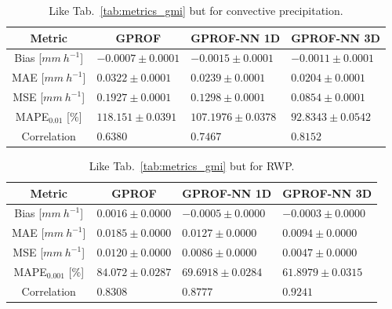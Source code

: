 \documentclass[journal abbreviation, manuscript]{copernicus}
\begin{document}
\begin{table}[hbpt!]
  \centering
  \caption{Like Tab.~\ref{tab:metrics_gmi} but for convective precipitation.}
  \label{tab:metrics_gmi_convective}
\begin{tabular}{|c||p{3.5cm}|p{3.5cm}|p{3.5cm}|}
  \hline
  Metric &
  \multicolumn{1}{|c}{GPROF} &
  \multicolumn{1}{|c}{GPROF-NN 1D} &
  \multicolumn{1}{|c|}{GPROF-NN 3D} \\
  \hline\hline
  Bias \hfill [$\unit{mm\ h^{-1}}$]   & \hfill $ -0.0007 \pm 0.0001$ &\hfill $ -0.0015 \pm 0.0001$ &\hfill $ -0.0011 \pm 0.0001$ \\
  MAE \hfill [$\unit{mm\ h^{-1}}$]    & \hfill $  0.0322 \pm 0.0001$ &\hfill $  0.0239 \pm 0.0001$ &\hfill $  0.0204 \pm 0.0001$ \\
  MSE \hfill [$\unit{mm\ h^{-1}}$]    & \hfill $  0.1927 \pm 0.0001$ &\hfill $  0.1298 \pm 0.0001$ &\hfill $  0.0854 \pm 0.0001$ \\
  MAPE$_{0.01}$ \hfill [$\unit{\%}$]  & \hfill $118.151 \pm 0.0391$ &\hfill $107.1976 \pm 0.0378$ &\hfill $ 92.8343 \pm 0.0542$ \\
  Correlation & \hfill $  0.6380 $ &\hfill $  0.7467 $ &\hfill $  0.8152 $ \\
  \hline
\end{tabular}
\end{table}


\begin{table}[hbpt!]
  \centering
  \caption{Like Tab.~\ref{tab:metrics_gmi} but for RWP.}
  \label{tab:metrics_gmi_rwp}
  \begin{tabular}{|c||p{3.5cm}|p{3.5cm}|p{3.5cm}|}
    \hline
    Metric &
    \multicolumn{1}{|c}{GPROF} &
    \multicolumn{1}{|c}{GPROF-NN 1D} &
    \multicolumn{1}{|c|}{GPROF-NN 3D} \\
    \hline\hline
    Bias \hfill [$\unit{mm\ h^{-1}}$]  & \hfill $  0.0016 \pm 0.0000$ &\hfill $ -0.0005 \pm 0.0000$ &\hfill $ -0.0003 \pm 0.0000$ \\
    MAE \hfill [$\unit{mm\ h^{-1}}$]   & \hfill $  0.0185 \pm 0.0000$ &\hfill $  0.0127 \pm 0.0000$ &\hfill $  0.0094 \pm 0.0000$ \\
    MSE \hfill [$\unit{mm\ h^{-1}}$]   & \hfill $  0.0120 \pm 0.0000$ &\hfill $  0.0086 \pm 0.0000$ &\hfill $  0.0047 \pm 0.0000$ \\
    MAPE$_{0.001}$ \hfill [$\unit{\%}$] & \hfill $ 84.072 \pm 0.0287$ &\hfill $ 69.6918 \pm 0.0284$ &\hfill $ 61.8979 \pm 0.0315$ \\
    Correlation & \hfill $  0.8308$ &\hfill $  0.8777$ &\hfill $ 0.9241$ \\
    \hline
  \end{tabular}
\end{table}
\clearpage
\end{document}
